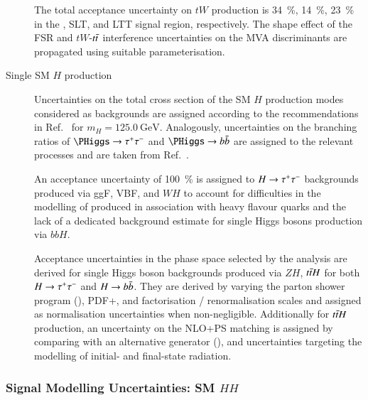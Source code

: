 \begin{description}
  The total acceptance uncertainty on $tW$ production is
  \SI{34}{\percent}, \SI{14}{\percent}, \SI{23}{\percent} in the
  \hadhad, \lephad SLT, and \lephad LTT signal region,
  respectively. The shape effect of the FSR and $tW$-$t\bar{t}$
  interference uncertainties on the MVA discriminants are propagated
  using suitable parameterisation.

\item[Single SM $H$ production] Uncertainties on the total cross
  section of the SM $H$ production modes considered as backgrounds are
  assigned according to the recommendations in
  Ref.~\cite{deFlorian:2016spz} for $m_{H} =
  \SI{125.0}{\GeV}$. Analogously, uncertainties on the branching
  ratios of $\PHiggs \to \tautau$ and $\PHiggs \to \bbbar$ are
  assigned to the relevant processes and are taken from
  Ref.~\cite{deFlorian:2016spz}.

  An acceptance uncertainty of \SI{100}{\percent} is assigned to
  $H \to \tau^{+} \tau^{-}$ backgrounds produced via ggF, VBF, and $WH$ to
  account for difficulties in the modelling of produced in association
  with heavy flavour quarks and the lack of a
  dedicated background estimate for single Higgs bosons production via
  $bbH$.

  Acceptance uncertainties in the phase space selected by the analysis
  are derived for single Higgs boson backgrounds produced via $ZH$,
  $t\bar{t} H$ for both $H \to \tau^{+} \tau^{-}$ and $H \to b\bar{b}$. They are
  derived by varying the parton shower program (\HERWIG[7]),
  PDF+\alphas, and factorisation / renormalisation scales and assigned
  as normalisation uncertainties when non-negligible. Additionally for
  $t\bar{t} H$ production, an uncertainty on the NLO+PS matching is
  assigned by comparing with an alternative generator
  (\MGNLO[v2.6.0]), and uncertainties targeting the modelling of
  initial- and final-state radiation.
\end{description}





\subsubsection{Signal Modelling Uncertainties: SM $HH$}

